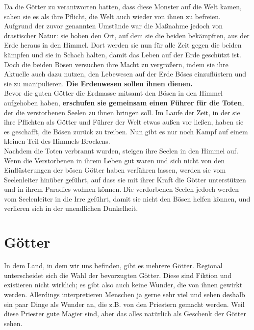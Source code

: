 Da die Götter zu verantworten hatten, dass diese Monster auf die Welt kamen, sahen sie es als ihre Pflicht, die Welt auch wieder von ihnen zu befreien. Aufgrund der zuvor genannten Umstände war die Maßnahme jedoch von drastischer Natur: sie hoben den Ort, auf dem sie die beiden bekämpften, aus der Erde heraus in den Himmel. Dort werden sie nun für alle Zeit gegen die beiden kämpfen und sie in Schach halten, damit das Leben auf der Erde geschützt ist.\\
Doch die beiden Bösen versuchen ihre Macht zu vergrößern, indem sie ihre Aktuelle auch dazu nutzen, den Lebewesen auf der Erde Böses einzuflüstern und sie zu manipulieren. \textbf{Die Erdenwesen sollen ihnen dienen.}\\
Bevor die guten Götter die Erdmasse mitsamt den Bösen in den Himmel aufgehoben haben, \textbf{erschufen sie gemeinsam einen Führer für die Toten}, der die verstorbenen Seelen zu ihnen bringen soll. Im Laufe der Zeit, in der sie ihre Pflichten als Götter und Führer der Welt etwas außen vor ließen, haben sie es geschafft, die Bösen zurück zu treiben. Nun gibt es nur noch Kampf auf einem kleinen Teil des Himmels-Brockens.\\
Nachdem die Toten verbrannt wurden, steigen ihre Seelen in den Himmel auf. Wenn die Verstorbenen in ihrem Leben gut waren und sich nicht von den Einflüsterungen der bösen Götter haben verführen lassen, werden sie vom Seelenleiter hinüber geführt, auf dass sie mit ihrer Kraft die Götter unterstützen und in ihrem Paradies wohnen können. Die verdorbenen Seelen jedoch werden vom Seelenleiter in die Irre geführt, damit sie nicht den Bösen helfen können, und verlieren sich in der unendlichen Dunkelheit.

\section{Götter}
In dem Land, in dem wir uns befinden, gibt es mehrere Götter. Regional unterscheidet sich die Wahl der bevorzugten Götter.
Diese sind Fiktion und existieren nicht wirklich; es gibt also auch keine Wunder, die von ihnen gewirkt werden. Allerdings interpretieren Menschen ja gerne sehr viel und sehen deshalb ein paar Dinge als Wunder an, die z.B. von den Priestern gemacht werden. Weil diese Priester gute Magier sind, aber das alles natürlich als Geschenk der Götter sehen.\\

